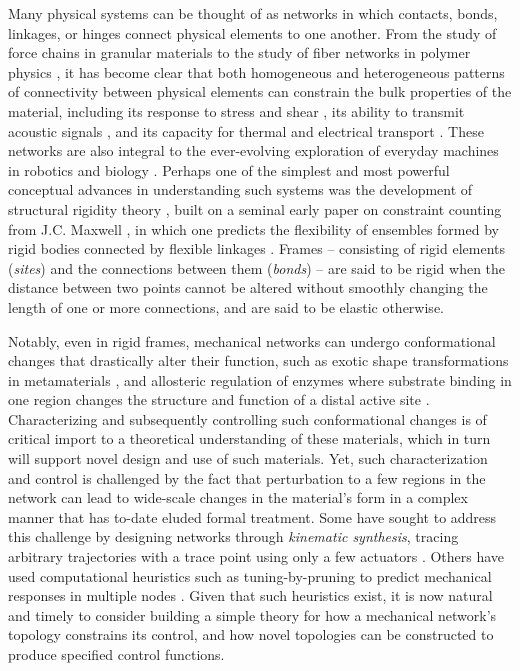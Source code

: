 \documentclass[%
preprint,
 amsmath,amssymb,
 aps,
]{revtex4-1}
\begin{document}
Many physical systems can be thought of as networks in which contacts, bonds, linkages, or hinges connect physical elements to one another. From the study of force chains in granular materials \cite{Papadopoulos2017network} to the study of fiber networks in polymer physics \cite{Picu2011mechanics}, it has become clear that both homogeneous and heterogeneous patterns of connectivity between physical elements can constrain the bulk properties of the material, including its response to stress and shear \cite{Vermeulen2017geometry}, its ability to transmit acoustic signals \cite{bassett2012influence}, and its capacity for thermal and electrical transport \cite{shi2014network}. These networks are also integral to the ever-evolving exploration of everyday machines \cite{norton2003design} in robotics \cite{detweiler2007robotics} and biology \cite{patek2007mantis}. Perhaps one of the simplest and most powerful conceptual advances in understanding such systems was the development of structural rigidity theory \cite{crapo1979structural}, built on a seminal early paper on constraint counting from J.C. Maxwell \cite{Maxwell1864}, in which one predicts the flexibility of ensembles formed by rigid bodies connected by flexible linkages \cite{Grimm1975, Hammonds1996, Broedersz2011, Sharma2016}. Frames -- consisting of rigid elements (\emph{sites}) and the connections between them (\emph{bonds}) \cite{lubensky2015phonons} -- are said to be rigid when the distance between two points cannot be altered without smoothly changing the length of one or more connections, and are said to be elastic otherwise. 

Notably, even in rigid frames, mechanical networks can undergo conformational changes that drastically alter their function, such as exotic shape transformations in metamaterials \cite{Bertoldi2017}, and allosteric regulation of enzymes where substrate binding in one region changes the structure and function of a distal active site \cite{Guo2016protein}. Characterizing and subsequently controlling such conformational changes is of critical import to a theoretical understanding of these materials, which in turn will support novel design and use of such materials. Yet, such characterization and control is challenged by the fact that perturbation to a few regions in the network can lead to wide-scale changes in the material's form in a complex manner that has to-date eluded formal treatment. Some have sought to address this challenge by designing networks through \emph{kinematic synthesis}, tracing arbitrary trajectories with a trace point using only a few actuators \cite{kempe1875trajectory, hartenberg1964linkage, kempe1877line}. Others have used computational heuristics such as tuning-by-pruning to predict mechanical responses in multiple nodes \cite{Rocks2017,goodrich2015pruning,Yan2017}. Given that such heuristics exist, it is now natural and timely to consider building a simple theory for how a mechanical network's topology constrains its control, and how novel topologies can be constructed to produce specified control functions.
\end{document}
